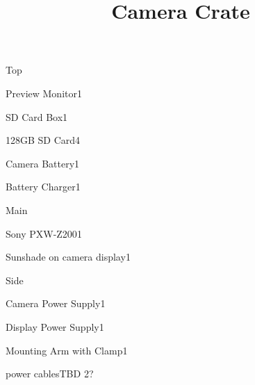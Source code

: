 \def\papersize{5}




\title{Camera Crate}

\begin{checklist}{Top}
  \item{Preview Monitor}{1}
  \item{SD Card Box}{1}
  \item{128GB SD Card}{4}
  \item{Camera Battery}{1}
  \item{Battery Charger}{1}
\end{checklist}

\begin{checklist}{Main}
  \item{Sony PXW-Z200}{1}
  \item{Sunshade on camera display}{1}
\end{checklist}

\begin{checklist}{Side}
  \item{Camera Power Supply}{1}
  \item{Display Power Supply}{1}
  \item{Mounting Arm with Clamp}{1}
  \item{power cables}{TBD 2?}
\end{checklist}



